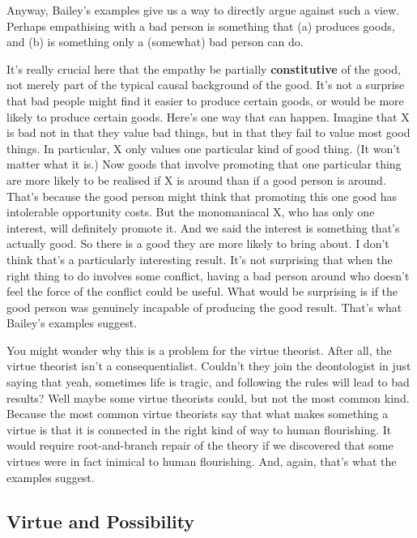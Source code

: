 \documentclass[
]{article}
\begin{document}
Anyway, Bailey's examples give us a way to directly argue against such a
view. Perhaps empathising with a bad person is something that (a)
produces goods, and (b) is something only a (somewhat) bad person can
do.

It's really crucial here that the empathy be partially
\textbf{constitutive} of the good, not merely part of the typical causal
background of the good. It's not a surprise that bad people might find
it easier to produce certain goods, or would be more likely to produce
certain goods. Here's one way that can happen. Imagine that X is bad not
in that they value bad things, but in that they fail to value most good
things. In particular, X only values one particular kind of good thing.
(It won't matter what it is.) Now goods that involve promoting that one
particular thing are more likely to be realised if X is around than if a
good person is around. That's because the good person might think that
promoting this one good has intolerable opportunity costs. But the
monomaniacal X, who has only one interest, will definitely promote it.
And we said the interest is something that's actually good. So there is
a good they are more likely to bring about. I don't think that's a
particularly interesting result. It's not surprising that when the right
thing to do involves some conflict, having a bad person around who
doesn't feel the force of the conflict could be useful. What would be
surprising is if the good person was genuinely incapable of producing
the good result. That's what Bailey's examples suggest.

You might wonder why this is a problem for the virtue theorist. After
all, the virtue theorist isn't a consequentialist. Couldn't they join
the deontologist in just saying that yeah, sometimes life is tragic, and
following the rules will lead to bad results? Well maybe some virtue
theorists could, but not the most common kind. Because the most common
virtue theorists say that what makes something a virtue is that it is
connected in the right kind of way to human flourishing. It would
require root-and-branch repair of the theory if we discovered that some
virtues were in fact inimical to human flourishing. And, again, that's
what the examples suggest.

\hypertarget{virtue-and-possibility}{%
\subsection{Virtue and Possibility}\label{virtue-and-possibility}}
\end{document}
